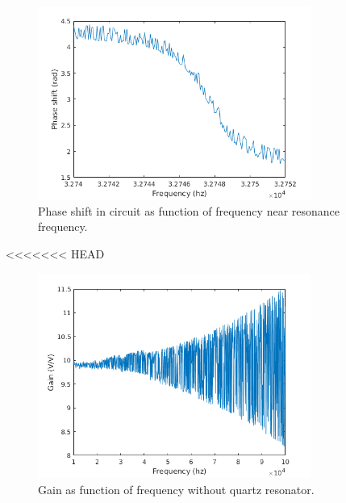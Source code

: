 \documentclass[12pt]{article}
\begin{document}
\begin{figure}[!ht]
\centering
\includegraphics[width = 0.8\textwidth]{kuvat/f-ps_res.png}
\caption{Phase shift in circuit as function of frequency near resonance frequency.}
\label{fig:f-ps_res}
\end{figure}

<<<<<<< HEAD


\begin{figure}[!ht]
\centering
\includegraphics[width = 0.8\textwidth]{kuvat/nsr.png}
\caption{Gain as function of frequency without quartz resonator.}
\label{fig:nsr}
\end{figure}
\end{document}

